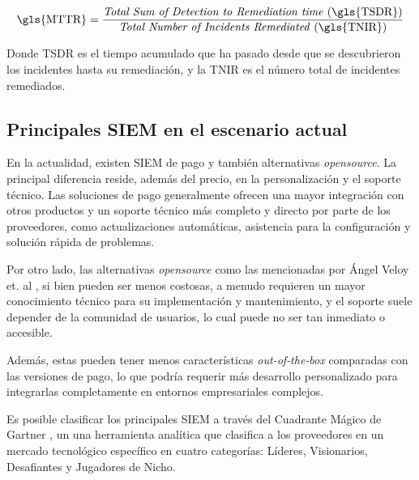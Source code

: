 \begin{equation}
\text{\gls{MTTR}} = \frac{\text{\textit{Total Sum of Detection to Remediation time} (\gls{TSDR})}}{\text{\textit{Total Number of Incidents Remediated} (\gls{TNIR})}}
\end{equation}

Donde \gls{TSDR} es el tiempo acumulado que ha pasado desde que se descubrieron los incidentes hasta su remediación, y la \gls{TNIR} es el número total de incidentes remediados.

 

\subsection{Principales SIEM en el escenario actual}

En la actualidad, existen \gls{SIEM} de pago y también alternativas \textit{opensource}. La principal diferencia reside, además del precio, en la personalización y el soporte técnico. Las soluciones de pago generalmente ofrecen una mayor integración con otros productos y un soporte técnico más completo y directo por parte de los proveedores, como actualizaciones automáticas, asistencia para la configuración y solución rápida de problemas.

Por otro lado, las alternativas \textit{opensource} como las mencionadas por Ángel Veloy et. al \cite{veloy2019ventajas}, si bien pueden ser menos costosas, a menudo requieren un mayor conocimiento técnico para su implementación y mantenimiento, y el soporte suele depender de la comunidad de usuarios, lo cual puede no ser tan inmediato o accesible. 

Además, estas pueden tener menos características \textit{out-of-the-box} comparadas con las versiones de pago, lo que podría requerir más desarrollo personalizado para integrarlas completamente en entornos empresariales complejos.

Es posible clasificar los principales \gls{SIEM} a través del Cuadrante Mágico de Gartner \cite{GartnerSIEM2024}, un una herramienta analítica que clasifica a los proveedores en un mercado tecnológico específico en cuatro categorías: Líderes, Visionarios, Desafiantes y Jugadores de Nicho.

